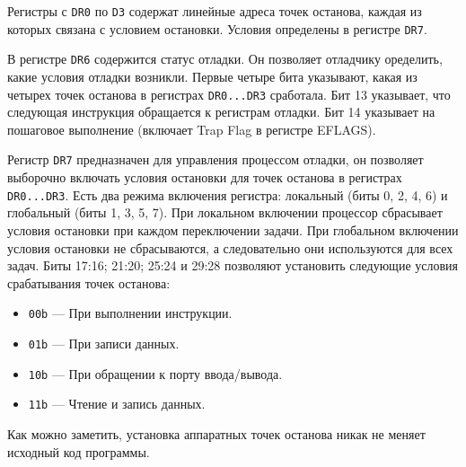 Регистры с \verb!DR0! по \verb!D3! содержат линейные адреса точек останова,
каждая из которых связана с условием остановки. Условия определены в регистре
\verb!DR7!.

В регистре \verb!DR6! содержится статус отладки. Он позволяет отладчику
оределить, какие условия отладки возникли. Первые четыре бита указывают, какая
из четырех точек останова в регистрах \verb!DR0...DR3! сработала. Бит 13
указывает, что следующая инструкция обращается к регистрам отладки. Бит 14
указывает на пошаговое выполнение (включает Trap Flag в регистре EFLAGS). 

Регистр \verb!DR7! предназначен для управления процессом отладки, он позволяет
выборочно включать условия остановки для точек останова в регистрах
\verb!DR0...DR3!. Есть два режима включения регистра: локальный (биты 0, 2, 4,
6) и глобальный (биты 1, 3, 5, 7). При локальном включении процессор сбрасывает
условия остановки при каждом переключении задачи. При глобальном включении
условия остановки не сбрасываются, а следовательно они используются для всех
задач. Биты 17:16; 21:20; 25:24 и 29:28 позволяют установить следующие условия
срабатывания точек останова:
\begin{itemize}
  \item \verb!00b! --- При выполнении инструкции.
  \item \verb!01b! --- При записи данных.
  \item \verb!10b! --- При обращении к порту ввода/вывода.
  \item \verb!11b! --- Чтение и запись данных.
\end{itemize}

Как можно заметить, установка аппаратных точек останова никак не меняет исходный
код программы.
